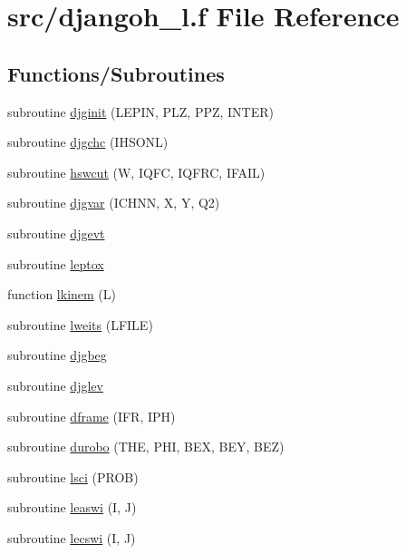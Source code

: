 \hypertarget{djangoh__l_8f}{}\section{src/djangoh\+\_\+l.f File Reference}
\label{djangoh__l_8f}
\subsection*{Functions/\+Subroutines}
\begin{DoxyCompactItemize}
\item 
subroutine \hyperlink{djangoh__l_8f_a398fcfae6bdeb7be322668b7cfc98878}{djginit} (L\+E\+P\+IN, P\+LZ, P\+PZ, I\+N\+T\+ER)
\item 
subroutine \hyperlink{djangoh__l_8f_a818c188c19621f059354054b7cfc8f5b}{djgchc} (I\+H\+S\+O\+NL)
\item 
subroutine \hyperlink{djangoh__l_8f_a5f0f05895586dd5880b80d2a36d647dc}{hswcut} (W, I\+Q\+FC, I\+Q\+F\+RC, I\+F\+A\+IL)
\item 
subroutine \hyperlink{djangoh__l_8f_a7d143aff9c64b502834443d7dc719784}{djgvar} (I\+C\+H\+NN, X, Y, Q2)
\item 
subroutine \hyperlink{djangoh__l_8f_aaef5d232aa8ab20561e8059749412c7c}{djgevt}
\item 
subroutine \hyperlink{djangoh__l_8f_a11067b9bff6d66852c24584cdc303b3c}{leptox}
\item 
function \hyperlink{djangoh__l_8f_a504b2325591f13f341edbbbf8cc70bfa}{lkinem} (L)
\item 
subroutine \hyperlink{djangoh__l_8f_a57410e89a3ce8563c8f3b4e5657ac043}{lweits} (L\+F\+I\+LE)
\item 
subroutine \hyperlink{djangoh__l_8f_ae6e9ed9cda4415025d1d496057a2d137}{djgbeg}
\item 
subroutine \hyperlink{djangoh__l_8f_af2c5433cb5aac85120afd2ae0ea3e0c6}{djglev}
\item 
subroutine \hyperlink{djangoh__l_8f_a2381dfce53fbaa48b3b2b9303fa19a97}{dframe} (I\+FR, I\+PH)
\item 
subroutine \hyperlink{djangoh__l_8f_a8d3e2719376add64f307b0aba47e7fd5}{durobo} (T\+HE, P\+HI, B\+EX, B\+EY, B\+EZ)
\item 
subroutine \hyperlink{djangoh__l_8f_a0ef4bc1f4f8f3990591d560768601578}{lsci} (P\+R\+OB)
\item 
subroutine \hyperlink{djangoh__l_8f_aa0d60d651866fc5f7452303bd873a6e9}{leaswi} (I, J)
\item 
subroutine \hyperlink{djangoh__l_8f_a5df9e96aec176c76cffd7bd51775500a}{lecswi} (I, J)

\end{DoxyCompactItemize}
